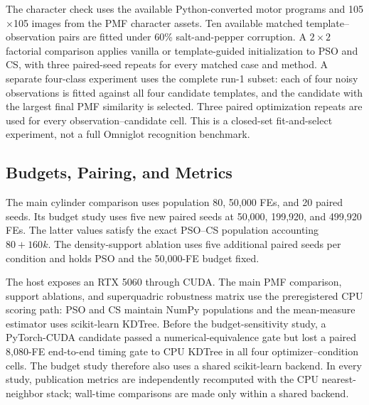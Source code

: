 \documentclass[conference]{IEEEtran}
\begin{document}
The character check uses the available Python-converted motor programs and
105$\times$105 images from the PMF character assets.  Ten available matched
template--observation pairs are fitted under 60\% salt-and-pepper corruption.
A $2\times2$ factorial comparison applies vanilla or template-guided
initialization to PSO and CS, with three paired-seed repeats for every matched
case and method.
A separate four-class experiment uses the complete run-1 subset: each of four
noisy observations is fitted against all four candidate templates, and the
candidate with the largest final PMF similarity is selected.  Three paired
optimization repeats are used for every observation--candidate cell.  This is a
closed-set fit-and-select experiment, not a full Omniglot recognition benchmark.

\subsection{Budgets, Pairing, and Metrics}
The main cylinder comparison uses population 80, 50,000 FEs, and 20 paired
seeds.  Its budget study uses five new paired seeds at 50,000, 199,920, and
499,920 FEs.  The latter values satisfy the exact PSO--CS population accounting
$80+160k$.  The density-support ablation uses five additional paired seeds per
condition and holds PSO and the 50,000-FE budget fixed.

The host exposes an RTX 5060 through CUDA.  The main PMF comparison, support
ablations, and superquadric robustness matrix use the preregistered CPU scoring
path: PSO and CS maintain NumPy populations and the mean-measure estimator uses
scikit-learn KDTree.  Before the budget-sensitivity study, a PyTorch-CUDA
candidate passed a numerical-equivalence gate but lost a paired 8,080-FE
end-to-end timing gate to CPU KDTree in all four optimizer--condition cells.
The budget study therefore also uses a shared scikit-learn backend.  In every
study, publication metrics are independently recomputed with the CPU
nearest-neighbor stack; wall-time comparisons are made only within a shared
backend.
\end{document}
